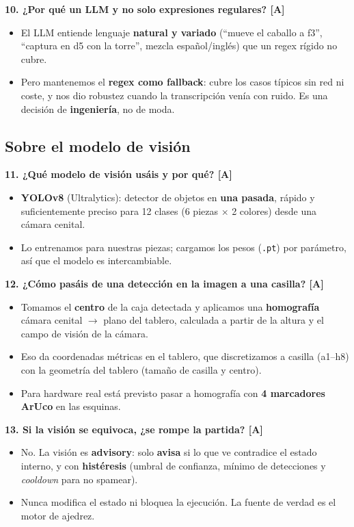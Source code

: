 \documentclass[11pt]{article}
\begin{document}
\textbf{10. ¿Por qué un LLM y no solo expresiones regulares? [A]}
\begin{itemize}
    \item El LLM entiende lenguaje \textbf{natural y variado} (``mueve el caballo
          a f3'', ``captura en d5 con la torre'', mezcla español/inglés) que un
          regex rígido no cubre.
    \item Pero mantenemos el \textbf{regex como fallback}: cubre los casos
          típicos sin red ni coste, y nos dio robustez cuando la transcripción
          venía con ruido. Es una decisión de \textbf{ingeniería}, no de moda.
\end{itemize}

\subsection*{Sobre el modelo de visión}

\textbf{11. ¿Qué modelo de visión usáis y por qué? [A]}
\begin{itemize}
    \item \textbf{YOLOv8} (Ultralytics): detector de objetos en \textbf{una
          pasada}, rápido y suficientemente preciso para 12 clases (6 piezas
          $\times$ 2 colores) desde una cámara cenital.
    \item Lo entrenamos para nuestras piezas; cargamos los pesos
          (\texttt{.pt}) por parámetro, así que el modelo es intercambiable.
\end{itemize}

\textbf{12. ¿Cómo pasáis de una detección en la imagen a una casilla? [A]}
\begin{itemize}
    \item Tomamos el \textbf{centro} de la caja detectada y aplicamos una
          \textbf{homografía} cámara cenital $\rightarrow$ plano del tablero,
          calculada a partir de la altura y el campo de visión de la cámara.
    \item Eso da coordenadas métricas en el tablero, que discretizamos a casilla
          (a1--h8) con la geometría del tablero (tamaño de casilla y centro).
    \item Para hardware real está previsto pasar a homografía con \textbf{4
          marcadores ArUco} en las esquinas.
\end{itemize}

\textbf{13. Si la visión se equivoca, ¿se rompe la partida? [A]}
\begin{itemize}
    \item No. La visión es \textbf{advisory}: solo \textbf{avisa} si lo que ve
          contradice el estado interno, y con \textbf{histéresis} (umbral de
          confianza, mínimo de detecciones y \textit{cooldown} para no spamear).
    \item Nunca modifica el estado ni bloquea la ejecución. La fuente de verdad
          es el motor de ajedrez.
\end{itemize}
\end{document}
